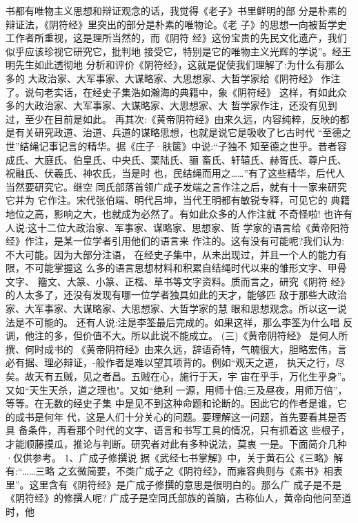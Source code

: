 \documentclass[12pt,UTF8]{ctexbook}
\begin{document}
书都有唯物主义思想和辩证观念的话，我觉得《老子》书里鲜明的部
分是朴素的辩证法，《阴符经》里突出的部分是朴素的唯物论。《老
子》的思想一向被哲学史工作者所重视，这是理所当然的，而《阴符
经》这份宝贵的先民文化遗产，我们似乎应该珍视它研究它，批判地
接受它，特别是它的唯物主义光辉的学说”。经王明先生如此透彻地
分析和评价《阴符经》，这就是促使我们理解了:为什么有那么多的
大政治家、大军事家、大谋略家、大思想家、大哲学家给《阴符经》
作注了。说句老实话，在经史子集浩如瀚海的典籍中，象《阴符经》
这样，有如此众多的大政治家、大军事家、大谋略家、大思想家、大
哲学家作注，还没有见到过，至少在目前是如此。
再其次:《黄帝阴符经》由来久远，内容纯粹，反映的都是有关研究政道、治道、兵道的谋略思想，也就是说它是吸收了匕古时代
“至德之世”结绳记事记言的精华。据《庄子·肤箧》中说:“子独不
知至德之世乎。昔者容成氏、大庭氏、伯皇氏、中央氏、栗陆氏、骊
畜氏、轩辕氏、赫胥氏、尊户氏、祝融氏、伏羲氏、神农氏，当是时
也，民结绳而用之……”有了这些精华，后代人当然要研究它。继空
同氏部落首领广成子发端之言作注之后，就有十一家来研究它并为
它作注。宋代张伯端、明代吕坤，当代王明都有敏锐专释，可见它的
典籍地位之高，影响之大，也就成为必然了。有如此众多的人作注就
不奇怪啦!
也许有人说:这十二位大政治家、军事家、谋略家、思想家、哲
学家的语言给《黄帝阳符经》作注，是某一位学者引用他们的语言来
作注的。这有没有可能呢?我们认为:不大可能。因为大部分注语，
在经史子集中，从未出现过，并且一个人的能力有限，不可能掌握这
么多的语言思想材料和积累自结绳时代以来的雏形文字、甲骨文字、
籀文、大篆、小篆、正楷、草书等文字资料。质而言之，研究《阴符
经》的人太多了，还没有发现有哪一位学者独具如此的天才，能够匹
敌于那些大政治家、大军事家、大谋略家、大思想家、大哲学家的慧
眼和思想观念。所以这一说法是不可能的。
还有人说:注是李筌最后完成的。如果这祥，那么李筌为什么唱
反调，他注的多，但价值不大。所以此说不能成立。
(三)《黄帝阴符经》
是何人所撰、何时成书的
《黄帝阴符经》由来久远，辞语奇特，气魄很大，胆略宏伟，言必有据、理必辩证，-般作者是难以望其项背的。例如“观天之道，
执天之行，尽矣。故天有五贼，见之者昌。五贼在心，施行于天，宇
宙在乎手，万化生乎身”。又如“天生天杀，道之理也"。又如“绝利
一源，用师十倍;三及昼夜，用师万倍”，等等。在无数的经史子集
中是见不到这种命题和论断的。因此它的作者是谁，它的成书是何年
代，这是人们十分关心的问题。要理解这一问题，首先要看其是否具
备条件，再看那个时代的文字、语言和书写工具的情况，只有抓着这
些根子，才能顺藤摸瓜，推论与判断。研究者对此有多种说法，莫衷
一是。下面简介几种·仅供参考。
1、广成子修撰说
据《武经七书掌解》中，关于黄石公《三略》解有:“……三略
之玄微简要，不类广成子之《阴符经》，而雍容典则与《素书》相表
里”。这里含有《阴符经》是广成子修撰的意思是很明白的。那么广
成子是不是《阴符经》的修撰人呢?
广成子是空同氏部族的首脑，古称仙人，黄帝向他问至道时，他
\end{document}
